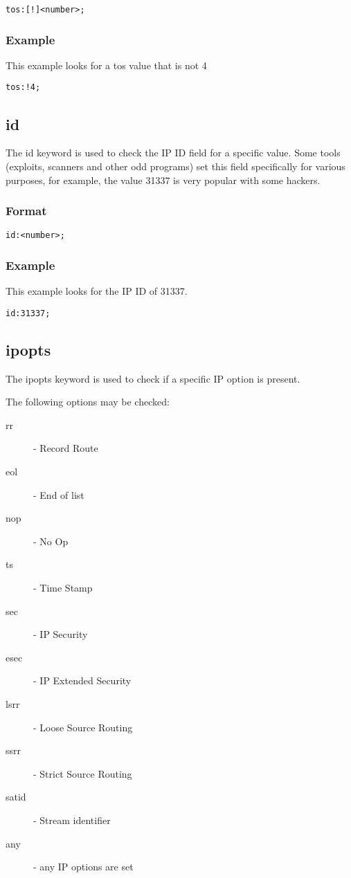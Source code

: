\documentclass[english]{report}
\begin{document}
\begin{verbatim}
tos:[!]<number>;
\end{verbatim}

\subsubsection{Example}

This example looks for a tos value that is not 4
\begin{verbatim}
tos:!4;
\end{verbatim}

\subsection{id}

The id keyword is used to check the IP ID field for a specific value.  Some
tools (exploits, scanners and other odd programs) set this field specifically
for various purposes, for example, the value 31337 is very popular with some
hackers. 

\subsubsection{Format}

\begin{verbatim}
id:<number>;
\end{verbatim}

\subsubsection{Example}

This example looks for the IP ID of 31337.
\begin{verbatim}
id:31337;
\end{verbatim}

\subsection{ipopts}

The ipopts keyword is used to check if a specific IP option is present.

The following options may be checked:
\begin{description}
\item [rr] - Record Route 
\item [eol] - End of list 
\item [nop] - No Op 
\item [ts] - Time Stamp 
\item [sec] - IP Security
\item [esec] - IP Extended Security
\item [lsrr] - Loose Source Routing 
\item [ssrr] - Strict Source Routing 
\item [satid] - Stream identifier
\item [any] - any IP options are set
\end{description}
\end{document}

